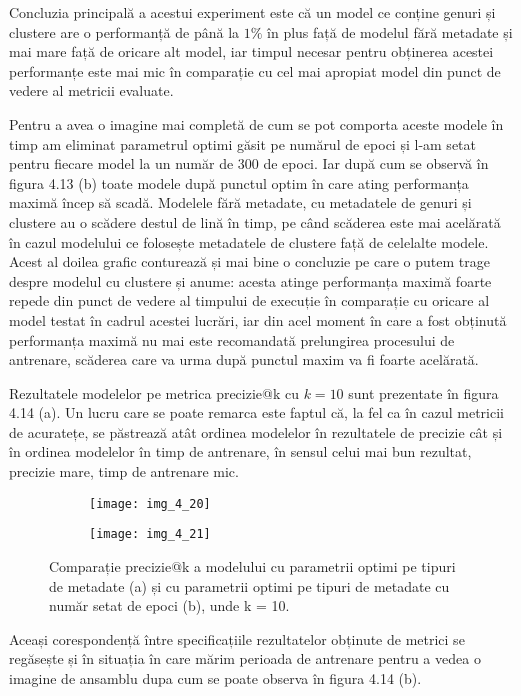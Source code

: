Concluzia principală a acestui experiment este că un model ce conține genuri și clustere are o performanță de până la $1\%$ în plus față de modelul fără metadate și mai mare față de oricare alt model, iar timpul necesar pentru obținerea acestei performanțe este mai mic în comparație cu cel mai apropiat model din punct de vedere al metricii evaluate.

Pentru a avea o imagine mai completă de cum se pot comporta aceste modele în timp am eliminat parametrul optimi găsit pe numărul de epoci și l-am setat pentru fiecare model la un număr de 300 de epoci. Iar după cum se observă în figura 4.13 (b) toate modele după punctul optim în care ating performanța maximă încep să scadă. Modelele fără metadate, cu metadatele de genuri și clustere au o scădere destul de lină în timp, pe când scăderea este mai acelărată în cazul modelului ce folosește metadatele de clustere față de celelalte modele. 
Acest al doilea grafic conturează și mai bine o concluzie pe care o putem trage despre modelul cu clustere și anume: acesta atinge performanța maximă foarte repede din punct de vedere al timpului de execuție în comparație cu oricare al model testat în cadrul acestei lucrări, iar din acel moment în care a fost obținută performanța maximă nu mai este recomandată prelungirea procesului de antrenare, scăderea care va urma după punctul maxim va fi foarte acelărată.

\vspace{5mm}
Rezultatele modelelor pe metrica precizie@k cu $k=10$ sunt prezentate în figura 4.14 (a). Un lucru care se poate remarca este faptul că, la fel ca în cazul metricii de acuratețe, se păstrează atât ordinea modelelor în rezultatele de precizie cât și în ordinea modelelor în timp de antrenare, în sensul celui mai bun rezultat, precizie mare, timp de antrenare mic.
\begin{figure}[!h]
  \begin{subfigure}[b]{0.5\textwidth}
    \texttt{[image: img\_4\_20]}
    \caption{}
    \label{fig:f1}
  \end{subfigure}
  \hfill
  \begin{subfigure}[b]{0.5\textwidth}
    \texttt{[image: img\_4\_21]}
    \caption{}
    \label{fig:f2}
  \end{subfigure}
  \caption[Comparație precizie@k a modelului cu parametrii optimi pe tipuri de metadate]{Comparație precizie@k a modelului cu parametrii optimi pe tipuri de metadate (a) și cu parametrii optimi pe tipuri de metadate cu număr setat de epoci (b), unde k = 10.}
\end{figure}
Aceași corespondență între specificațiile rezultatelor obținute de metrici se regăsește și în situația în care mărim perioada de antrenare pentru a vedea o imagine de ansamblu dupa cum se poate observa în figura 4.14 (b).

